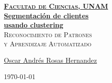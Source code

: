 \documentclass[12pt, fleqn]{report}                             %
\author{Oscar Andrés Rosas}                                     %
\theoremstyle{break}                                            %
\begin{document}
\begin{titlepage}
    
    \pagecolor{TitlePageColor}                                      %
    \color{white}                                                   %

    \vspace                                                         %
    \baselineskip                                                   %

    \makebox[0pt][l]{\rule{1.3\textwidth}{3pt}}                     %
    
    \href{https://compilandoconocimiento.com}                       %
    {\textbf{\textsc{\Huge Facultad de Ciencias, UNAM}}}\\[2.7cm]      %

    \href{\ProjectNameLink}                                         %
    {\fontsize{35}{42}\selectfont \textbf{Segmentación de clientes\\usando clustering}}\\[0.5cm] %
    \textcolor{ColorSubtext}{\textsc{\Huge Reconocimiento de Patrones \\y Aprendizaje Automatizado}}     %
    
    \vfill                                                          %
    
    \href{\ProjectAuthorLink}                                       %
    {\LARGE \textsf{Oscar Andrés Rosas Hernandez}}                  %

    \vspace                                                         %
    \baselineskip                                                   %
    
    {\large \textsf{\today}}                                        %

\end{titlepage}
\end{document}
